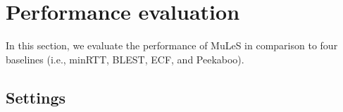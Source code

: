 \section{Performance evaluation}
\label{sec:evaluation}

In this section, we evaluate the performance of MuLeS in comparison to four baselines (i.e., minRTT, BLEST, ECF, and Peekaboo).


\subsection{Settings}
\label{subsec:experiment}

